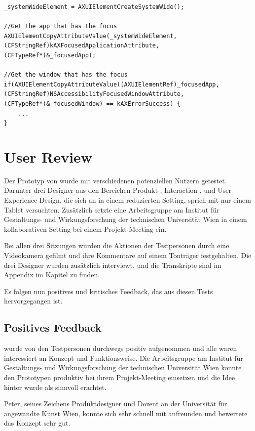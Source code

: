 \begin{lstlisting}[float,caption=Laden von Accessibility Daten,label=lst:accessiblityDaten]
_systemWideElement = AXUIElementCreateSystemWide();
	
//Get the app that has the focus
AXUIElementCopyAttributeValue(_systemWideElement, (CFStringRef)kAXFocusedApplicationAttribute, (CFTypeRef*)&_focusedApp);

//Get the window that has the focus
if(AXUIElementCopyAttributeValue((AXUIElementRef)_focusedApp, (CFStringRef)NSAccessibilityFocusedWindowAttribute, (CFTypeRef*)&_focusedWindow) == kAXErrorSuccess) {
    ...
}		
\end{lstlisting}

\section{User Review} \label{sec:userReview}
Der Prototyp von \scribbler wurde mit verschiedenen potenziellen Nutzern getestet. Darunter drei Designer aus den Bereichen Produkt-, Interaction-, und User Experience Design, die sich an \scribbler in einem reduzierten Setting, sprich mit nur einem Tablet versuchten. Zusätzlich setzte eine Arbeitsgruppe am Institut für Gestaltungs- und Wirkungsforschung der technischen Universität Wien \scribbler in einem kollaborativen Setting bei einem Projekt-Meeting ein. 

Bei allen drei Sitzungen wurden die Aktionen der Testpersonen durch eine Videokamera gefilmt und ihre Kommentare auf einem Tonträger festgehalten. Die drei Designer wurden zusätzlich interviewt, und die Transkripte sind im Appendix im Kapitel  zu finden.

Es folgen nun positives und kritisches Feedback, das aus diesen Tests hervorgegangen ist.

\subsection{Positives Feedback}

\scribbler wurde von den Testpersonen durchwegs positiv aufgenommen und alle waren interessiert an Konzept und Funktionsweise. Die Arbeitsgruppe am Institut für Gestaltungs- und Wirkungsforschung der technischen Universität Wien konnte den Prototypen produktiv bei ihrem Projekt-Meeting einsetzen und die Idee hinter \scribbler wurde als sinnvoll erachtet. 

Peter, seines Zeichens Produktdesigner und Dozent an der Universität für angewandte Kunst Wien, konnte sich sehr schnell mit \scribbler anfreunden und bewertete das Konzept sehr gut.

